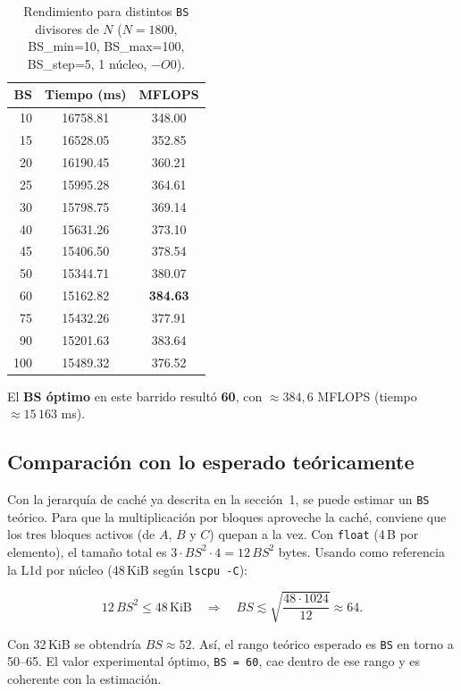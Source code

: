 \documentclass[11pt,a4paper]{article}
\begin{document}
\begin{table}[H]
\centering
\begin{tabular}{@{}rcc@{}}
\toprule
\textbf{BS} & \textbf{Tiempo (ms)} & \textbf{MFLOPS} \\
\midrule
10  & 16758.81 & 348.00  \\
15  & 16528.05 & 352.85  \\
20  & 16190.45 & 360.21  \\
25  & 15995.28 & 364.61  \\
30  & 15798.75 & 369.14  \\
40  & 15631.26 & 373.10  \\
45  & 15406.50 & 378.54  \\
50  & 15344.71 & 380.07  \\
60  & 15162.82 & \textbf{384.63} \\
75  & 15432.26 & 377.91  \\
90  & 15201.63 & 383.64  \\
100 & 15489.32 & 376.52  \\
\bottomrule
\end{tabular}
\caption{Rendimiento para distintos \texttt{BS} divisores de \(N\) (\(N=1800\), BS\_min=10, BS\_max=100, BS\_step=5, 1 núcleo, \(-O0\)).}
\label{tab:bs}
\end{table}

El \textbf{BS óptimo} en este barrido resultó \textbf{60}, con \(\approx 384{,}6\) MFLOPS (tiempo \(\approx 15\,163\) ms).

\subsection{Comparación con lo esperado teóricamente}

Con la jerarquía de caché ya descrita en la sección~1, se puede estimar un \texttt{BS} teórico. Para que la multiplicación por bloques aproveche la caché, conviene que los tres bloques activos (de \(A\), \(B\) y \(C\)) quepan a la vez. Con \texttt{float} (4\,B por elemento), el tamaño total es \(3 \cdot BS^2 \cdot 4 = 12\,BS^2\) bytes. Usando como referencia la L1d por núcleo (48\,KiB según \texttt{lscpu -C}):

\[
12\,BS^2 \leq 48\,\text{KiB} \quad \Rightarrow \quad BS \lesssim \sqrt{\frac{48 \cdot 1024}{12}} \approx 64.
\]

Con 32\,KiB se obtendría \(BS \approx 52\). Así, el rango teórico esperado es \texttt{BS} en torno a 50--65. El valor experimental óptimo, \texttt{BS = 60}, cae dentro de ese rango y es coherente con la estimación.
\end{document}
